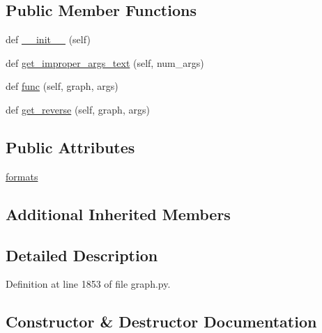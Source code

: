 \subsection*{Public Member Functions}
\begin{DoxyCompactItemize}
\item 
def \hyperlink{classlight__chats_1_1graph_1_1LockFunction_a3b0ae63ba1342ce53d664a879f040f7a}{\+\_\+\+\_\+init\+\_\+\+\_\+} (self)
\item 
def \hyperlink{classlight__chats_1_1graph_1_1LockFunction_a816faf6314525be44d40024fd83d72d8}{get\+\_\+improper\+\_\+args\+\_\+text} (self, num\+\_\+args)
\item 
def \hyperlink{classlight__chats_1_1graph_1_1LockFunction_afdb92aaa380487d44d27381bd168240a}{func} (self, graph, args)
\item 
def \hyperlink{classlight__chats_1_1graph_1_1LockFunction_a90dd7a90a271b6d2f27b17f6796daa91}{get\+\_\+reverse} (self, graph, args)
\end{DoxyCompactItemize}
\subsection*{Public Attributes}
\begin{DoxyCompactItemize}
\item 
\hyperlink{classlight__chats_1_1graph_1_1LockFunction_a5a4e9e70cf33889e84cc3d713cb3a270}{formats}
\end{DoxyCompactItemize}
\subsection*{Additional Inherited Members}


\subsection{Detailed Description}
\begin{DoxyVerb}
\end{DoxyVerb}
 

Definition at line 1853 of file graph.\+py.



\subsection{Constructor \& Destructor Documentation}
\mbox{\label{classlight__chats_1_1graph_1_1LockFunction_a3b0ae63ba1342ce53d664a879f040f7a}} 
